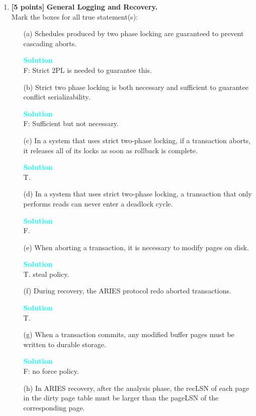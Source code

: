 \documentclass[10pt]{article}
\newenvironment{solution}
    { \begin{mdframed}[backgroundcolor=gray!10] \textcolor{cyan}{\textbf{Solution}} \\}
    {  \end{mdframed}}
\begin{document}
\begin{enumerate}
		  \item \textbf{[5 points]} \textbf{General Logging and Recovery.} \\
	      Mark the boxes for all true statement(s):
	      \begin{itemize}
		      \item[(a)] Schedules produced by two phase locking are guaranteed to prevent cascading aborts.
		            \begin{solution}
			            F: Strict 2PL is needed to guarantee this.
		            \end{solution}
		      \item[(b)] Strict two phase locking is both necessary and sufficient to guarantee conflict serializability.
		            \begin{solution}
			            F: Sufficient but not necessary.
		            \end{solution}
		      \item[(c)] In a system that uses strict two-phase locking, if a transaction aborts, it releases all of its locks as soon as rollback is complete.
		            \begin{solution}
			            T.
		            \end{solution}
		      \item[(d)] In a system that uses strict two-phase locking, a transaction that only performs reads can never enter a deadlock cycle.
		            \begin{solution}
			            F.
		            \end{solution}
		      \item[(e)] When aborting a transaction, it is necessary to modify pages on disk.
		            \begin{solution}
			            T. steal policy.
		            \end{solution}
		      \item[(f)] During recovery, the ARIES protocol redo aborted transactions.
		            \begin{solution}
			            T.
		            \end{solution}
		      \item[(g)] When a transaction commits, any modified buffer pages must be written to durable storage.
		            \begin{solution}
			            F: no force policy.
		            \end{solution}
		      \item[(h)] In ARIES recovery, after the analysis phase, the recLSN of each page in the dirty page table must be larger than the pageLSN of the corresponding page.

\end{itemize}
\end{enumerate}
\end{document}
